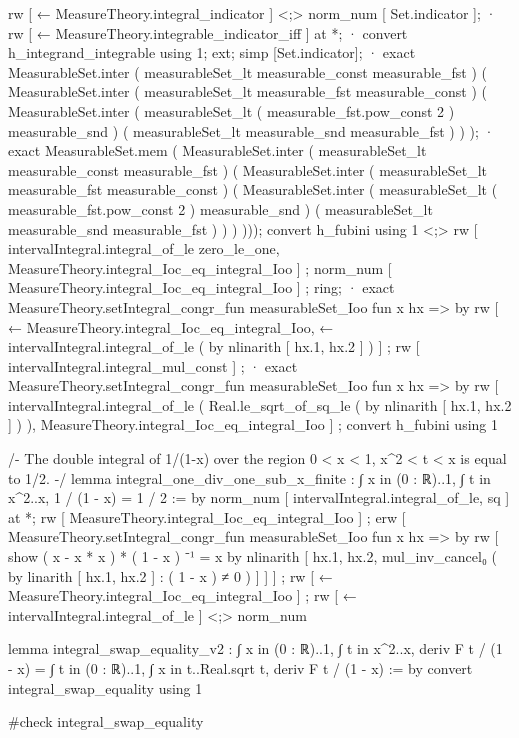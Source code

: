           rw [ ← MeasureTheory.integral_indicator ] <;> norm_num [ Set.indicator ];
        · rw [ ← MeasureTheory.integrable_indicator_iff ] at *;
          · convert h_integrand_integrable using 1;
            ext; simp [Set.indicator];
          · exact MeasurableSet.inter ( measurableSet_lt measurable_const measurable_fst ) ( MeasurableSet.inter ( measurableSet_lt measurable_fst measurable_const ) ( MeasurableSet.inter ( measurableSet_lt ( measurable_fst.pow_const 2 ) measurable_snd ) ( measurableSet_lt measurable_snd measurable_fst ) ) );
      · exact MeasurableSet.mem ( MeasurableSet.inter ( measurableSet_lt measurable_const measurable_fst ) ( MeasurableSet.inter ( measurableSet_lt measurable_fst measurable_const ) ( MeasurableSet.inter ( measurableSet_lt ( measurable_fst.pow_const 2 ) measurable_snd ) ( measurableSet_lt measurable_snd measurable_fst ) ) ) )));
    convert h_fubini using 1 <;> rw [ intervalIntegral.integral_of_le zero_le_one, MeasureTheory.integral_Ioc_eq_integral_Ioo ] ; norm_num [ MeasureTheory.integral_Ioc_eq_integral_Ioo ] ; ring;
    · exact MeasureTheory.setIntegral_congr_fun measurableSet_Ioo fun x hx => by rw [ ← MeasureTheory.integral_Ioc_eq_integral_Ioo, ← intervalIntegral.integral_of_le ( by nlinarith [ hx.1, hx.2 ] ) ] ; rw [ intervalIntegral.integral_mul_const ] ;
    · exact MeasureTheory.setIntegral_congr_fun measurableSet_Ioo fun x hx => by rw [ intervalIntegral.integral_of_le ( Real.le_sqrt_of_sq_le ( by nlinarith [ hx.1, hx.2 ] ) ), MeasureTheory.integral_Ioc_eq_integral_Ioo ] ;
  convert h_fubini using 1

/-
The double integral of 1/(1-x) over the region 0 < x < 1, x^2 < t < x is equal to 1/2.
-/
lemma integral_one_div_one_sub_x_finite :
  ∫ x in (0 : ℝ)..1, ∫ t in x^2..x, 1 / (1 - x) = 1 / 2 := by
    norm_num [ intervalIntegral.integral_of_le, sq ] at *;
    rw [ MeasureTheory.integral_Ioc_eq_integral_Ioo ] ; erw [ MeasureTheory.setIntegral_congr_fun measurableSet_Ioo fun x hx => by rw [ show ( x - x * x ) * ( 1 - x ) ⁻¹ = x by nlinarith [ hx.1, hx.2, mul_inv_cancel₀ ( by linarith [ hx.1, hx.2 ] : ( 1 - x ) ≠ 0 ) ] ] ] ; rw [ ← MeasureTheory.integral_Ioc_eq_integral_Ioo ] ;
    rw [ ← intervalIntegral.integral_of_le ] <;> norm_num

lemma integral_swap_equality_v2 : ∫ x in (0 : ℝ)..1, ∫ t in x^2..x, deriv F t / (1 - x) = ∫ t in (0 : ℝ)..1, ∫ x in t..Real.sqrt t, deriv F t / (1 - x) := by
  convert integral_swap_equality using 1

#check integral_swap_equality

